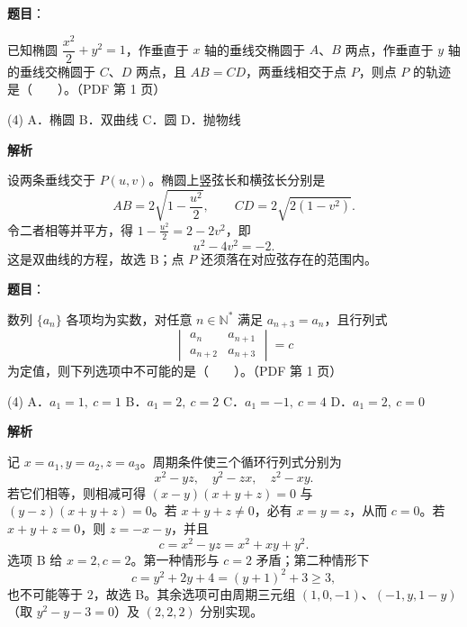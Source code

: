\begin{answer}

\textbf{题目}：

已知椭圆 $\dfrac{x^2}{2}+y^2=1$，作垂直于 $x$ 轴的垂线交椭圆于 $A$、$B$ 两点，作垂直于 $y$ 轴的垂线交椭圆于 $C$、$D$ 两点，且 $AB=CD$，两垂线相交于点 $P$，则点 $P$ 的轨迹是\mbox{（　　）}。（PDF 第 1 页）

\begin{gkopts}(4)
\task A．椭圆
\task B．双曲线
\task C．圆
\task D．抛物线
\end{gkopts}

\textbf{解析}

设两条垂线交于 $P(u,v)$。椭圆上竖弦长和横弦长分别是
\nopagebreak[4]
\[
AB=2\sqrt{1-\frac{u^2}{2}},\qquad CD=2\sqrt{2(1-v^2)}.
\]
令二者相等并平方，得 $1-\frac{u^2}{2}=2-2v^2$，即
\nopagebreak[4]
\[
u^2-4v^2=-2.
\]
这是双曲线的方程，故选 B；点 $P$ 还须落在对应弦存在的范围内。


\end{answer}
\begin{answer}

\textbf{题目}：

数列 $\{a_n\}$ 各项均为实数，对任意 $n\in\mathbb N^*$ 满足 $a_{n+3}=a_n$，且行列式
\nopagebreak[4]
\[
\begin{vmatrix}a_n&a_{n+1}\\a_{n+2}&a_{n+3}\end{vmatrix}=c
\]
为定值，则下列选项中不可能的是\mbox{（　　）}。（PDF 第 1 页）

\begin{gkopts}(4)
\task A．$a_1=1,\ c=1$
\task B．$a_1=2,\ c=2$
\task C．$a_1=-1,\ c=4$
\task D．$a_1=2,\ c=0$
\end{gkopts}

\textbf{解析}

记 $x=a_1,y=a_2,z=a_3$。周期条件使三个循环行列式分别为
\nopagebreak[4]
\[
x^2-yz,\quad y^2-zx,\quad z^2-xy.
\]
若它们相等，则相减可得 $(x-y)(x+y+z)=0$ 与 $(y-z)(x+y+z)=0$。若 $x+y+z\ne0$，必有 $x=y=z$，从而 $c=0$。若 $x+y+z=0$，则 $z=-x-y$，并且
\nopagebreak[4]
\[
c=x^2-yz=x^2+xy+y^2.
\]
选项 B 给 $x=2,c=2$。第一种情形与 $c=2$ 矛盾；第二种情形下
\nopagebreak[4]
\[
c=y^2+2y+4=(y+1)^2+3\ge3,
\]
也不可能等于 $2$，故选 B。其余选项可由周期三元组 $(1,0,-1)$、$(-1,y,1-y)$（取 $y^2-y-3=0$）及 $(2,2,2)$ 分别实现。


\end{answer}

